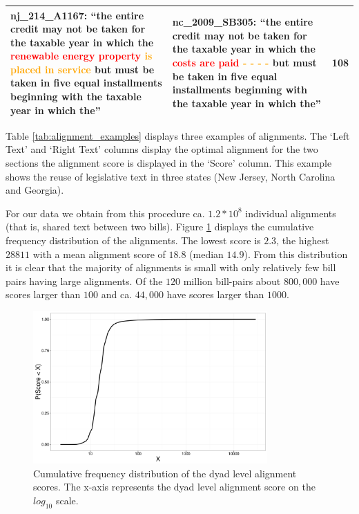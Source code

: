 \documentclass[12pt]{article} %
\begin{document}
\begin{table}[ht!]
\begin{tabular}{p{}|p{}|p{}}
\textbf{nj\_214\_A1167}: ``the entire credit may not be taken for the taxable
year in which the \textcolor{red}{\textbf{renewable energy property}}
\textcolor{orange}{is placed in
service} but must be taken in five equal installments beginning with the
taxable year in which the'' & \textbf{nc\_2009\_SB305}: ``the entire credit
may not be taken for the taxable year in which the \textcolor{red}{\textbf{costs
are paid}} \textcolor{orange}{- - - -}
but must be taken in five equal installments beginning with the taxable year
in which the'' & 108\\
\hline
\end{tabular}
\egroup
\end{table}

\clearpage

 Table \ref{tab:alignment_examples} displays three examples of alignments. The `Left Text' and `Right Text' columns display the optimal alignment for the two sections the alignment score is displayed in the `Score' column. This example shows the reuse of legislative text in three states (New Jersey, North Carolina and Georgia). 
 
For our data we obtain from this procedure ca. $1.2 * 10^8$ individual alignments (that is, shared
text between two bills). Figure \ref{fig:alignment_score_distribution} displays the cumulative frequency
distribution of the alignments. The lowest score is $2.3$, the highest $28811$ with a mean
alignment score of $18.8$ (median $14.9$). From this distribution it is clear that the
majority of alignments is small with only relatively few bill pairs having
large alignments. Of the $120$ million bill-pairs about $800,000$ have scores
larger than $100$ and ca. $44,000$ have scores larger than $1000$.

\begin{figure}[ht!]
    \centering
    \includegraphics[width=0.8\textwidth]{figures/alignment_score_distribution.png}
    \caption{Cumulative frequency distribution of the dyad level alignment
    scores. The x-axis represents the dyad level alignment score on the
    $log_{10}$ scale.}
    \label{fig:alignment_score_distribution}
\end{figure}
\end{document}
